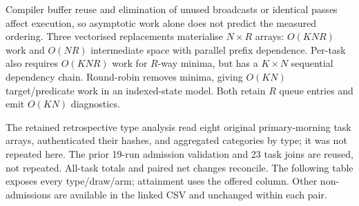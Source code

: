 \documentclass[12pt,a4paper]{article}
\begin{document}
Compiler buffer reuse and elimination of unused broadcasts or identical passes affect execution, so asymptotic work alone does not predict the measured ordering. Three vectorised replacements materialise $N\times R$ arrays: $O(KNR)$ work and $O(NR)$ intermediate space with parallel prefix dependence. Per-task also requires $O(KNR)$ work for $R$-way minima, but has a $K\times N$ sequential dependency chain. Round-robin removes minima, giving $O(KN)$ target/predicate work in an indexed-state model. Both retain $R$ queue entries and emit $O(KN)$ diagnostics.

The retained retrospective type analysis read eight original primary-morning task arrays, authenticated their hashes, and aggregated categories by type; it was not repeated here. The prior 19-run admission validation and 23 task joins are reused, not repeated. All-task totals and paired net changes reconcile. The following table exposes every type/draw/arm; attainment uses the offered column. Other non-admissions are available in the linked CSV and unchanged within each pair.
\end{document}
